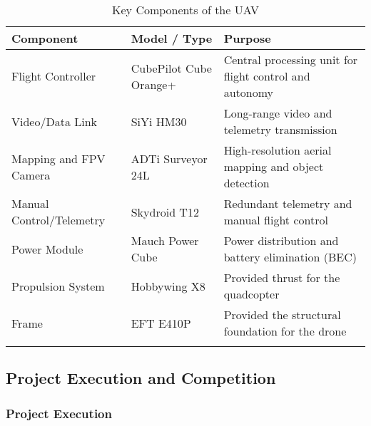 \vspace*{1cm}
\begin{longtable}[h!]{|l|l|p{5cm}|} \hline
	\textbf{Component}       & \textbf{Model / Type}       & \textbf{Purpose}                                        \\ \hline
	Flight Controller        & CubePilot Cube Orange+      & Central processing unit for flight control and autonomy \\ \hline
	Video/Data Link          & SiYi HM30                   & Long-range video and telemetry transmission             \\ \hline
	Mapping and FPV Camera   & ADTi Surveyor 24L           & High-resolution aerial mapping and object detection     \\ \hline
	Manual Control/Telemetry & Skydroid T12                & Redundant telemetry and manual flight control           \\ \hline
	Power Module             & Mauch Power Cube            & Power distribution and battery elimination (BEC)        \\ \hline
	Propulsion System        & Hobbywing X8                & Provided thrust for the quadcopter                      \\ \hline
	Frame                    & EFT E410P  & Provided the structural foundation for the drone        \\ \hline
	\caption{Key Components of the UAV}
\end{longtable}


\subsection{Project Execution and Competition}

\subsubsection{Project Execution}

